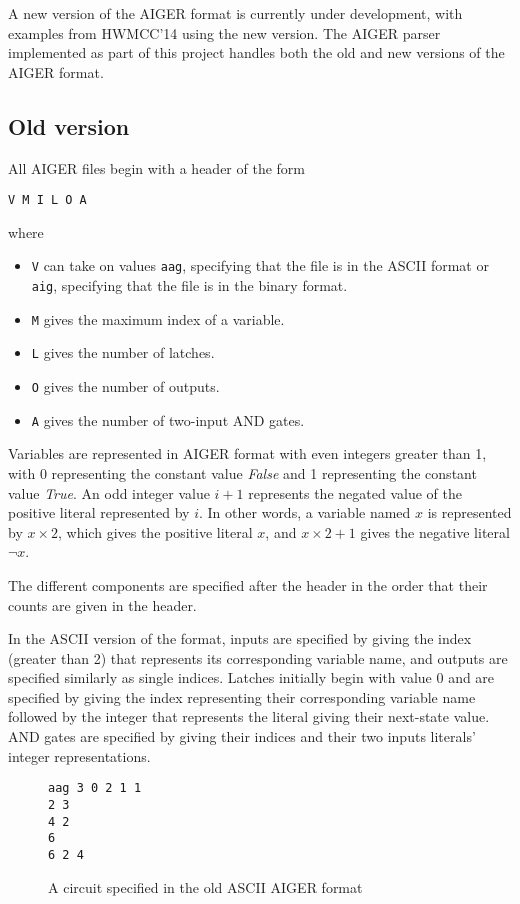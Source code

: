 \documentclass[12pt,a4paper,twoside,openright]{report}
\begin{document}
A new version of the AIGER format is currently under development, with
examples from HWMCC'14 using the new version. The AIGER parser implemented
as part of this project handles both the old and new versions of the AIGER
format.

\subsection{Old version}

All AIGER files begin with a header of the form
\begin{verbatim}
V M I L O A
\end{verbatim}
where
\begin{itemize}
\item \verb,V, can take on values \verb,aag,, specifying that the file is in the ASCII format or \verb,aig,,
specifying that the file is in the binary format.
\item \verb,M, gives the maximum index of a variable.
\item \verb,L, gives the number of latches.
\item \verb,O, gives the number of outputs.
\item \verb,A, gives the number of two-input AND gates.
\end{itemize}

Variables are represented in AIGER format with even integers greater than
1, with 0 representing the constant value {\it False} and 1
representing the constant value {\it True}.
An odd integer value $i + 1$ represents the negated value of the positive
literal represented by $i$.
In other words, a variable named $x$ is represented by $x \times 2$,
which gives the positive literal $x$, and $x \times 2 + 1$ gives the
negative literal $\neg x$.

The different components are specified after the header
in the order that their counts are given in the header.

In the ASCII version of the format, inputs are specified by giving the
index (greater than 2) that represents its corresponding variable name,
and outputs are specified similarly as single indices.
Latches initially begin with value 0 and are specified by giving the
index representing
their corresponding variable name followed by the integer that represents
the literal giving their next-state value.
AND gates are specified by giving their indices and their two inputs
literals' integer representations.

\begin{figure}[h]
\centering
\begin{verbatim}
aag 3 0 2 1 1
2 3
4 2
6
6 2 4
\end{verbatim}
\caption{
A circuit specified in the old ASCII AIGER format
}
\label{aagCircuit}
\end{figure}
\end{document}

